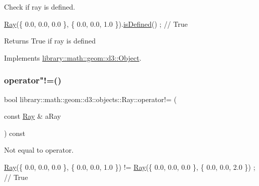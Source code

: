 Check if ray is defined. 


\begin{DoxyCode}
\hyperlink{classlibrary_1_1math_1_1geom_1_1d3_1_1objects_1_1_ray_a11b7613464daaebc6e25a758b057f203}{Ray}(\{ 0.0, 0.0, 0.0 \}, \{ 0.0, 0.0, 1.0 \}).\hyperlink{classlibrary_1_1math_1_1geom_1_1d3_1_1objects_1_1_ray_a7329f77a549a02e9c27d07c11adcc8bf}{isDefined}() ; \textcolor{comment}{// True}
\end{DoxyCode}


\begin{DoxyReturn}{Returns}
True if ray is defined 
\end{DoxyReturn}


Implements \hyperlink{classlibrary_1_1math_1_1geom_1_1d3_1_1_object_a2216442e322f0c3ca5f01a4efa22baf7}{library\+::math\+::geom\+::d3\+::\+Object}.

\mbox{\label{classlibrary_1_1math_1_1geom_1_1d3_1_1objects_1_1_ray_a0cd84346b37f62793b565c87ae4659fb}} 
\subsubsection{\texorpdfstring{operator"!=()}{operator!=()}}
{\footnotesize\ttfamily bool library\+::math\+::geom\+::d3\+::objects\+::\+Ray\+::operator!= (\begin{DoxyParamCaption}\item[{const \hyperlink{classlibrary_1_1math_1_1geom_1_1d3_1_1objects_1_1_ray}{Ray} \&}]{a\+Ray }\end{DoxyParamCaption}) const}



Not equal to operator. 


\begin{DoxyCode}
\hyperlink{classlibrary_1_1math_1_1geom_1_1d3_1_1objects_1_1_ray_a11b7613464daaebc6e25a758b057f203}{Ray}(\{ 0.0, 0.0, 0.0 \}, \{ 0.0, 0.0, 1.0 \}) != \hyperlink{classlibrary_1_1math_1_1geom_1_1d3_1_1objects_1_1_ray_a11b7613464daaebc6e25a758b057f203}{Ray}(\{ 0.0, 0.0, 0.0 \}, \{ 0.0, 0.0, 2.0 \}) ; \textcolor{comment}{// True}
\end{DoxyCode}



